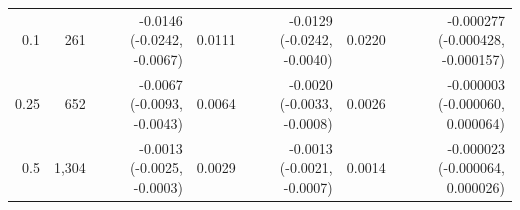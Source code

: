 \begin{tabular}{rrrrrrr}
0.1 & 261 & -0.0146 (-0.0242, -0.0067) & 0.0111 & -0.0129 (-0.0242, -0.0040) & 0.0220 & -0.000277 (-0.000428, -0.000157) \\
0.25 & 652 & -0.0067 (-0.0093, -0.0043) & 0.0064 & -0.0020 (-0.0033, -0.0008) & 0.0026 & -0.000003 (-0.000060, 0.000064) \\
0.5 & 1,304 & -0.0013 (-0.0025, -0.0003) & 0.0029 & -0.0013 (-0.0021, -0.0007) & 0.0014 & -0.000023 (-0.000064, 0.000026) \\
\bottomrule
\end{tabular}
